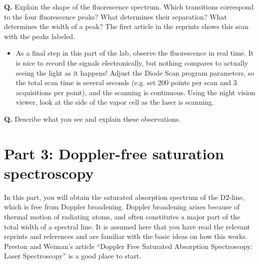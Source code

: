 \documentclass{../lab}
\begin{document}
\textbf{Q.} Explain the shape of the fluorescence spectrum. Which transitions correspond to the four fluorescence peaks? What determines their separation? What determines the width of a peak? The first article in the reprints shows this scan with the peaks labeled.

\begin{itemize}
    \item As a final step in this part of the lab, observe the fluorescence in real time. It is nice to record the signals electronically, but nothing compares to actually seeing the light as it happens! Adjust the Diode Scan program parameters, so the total scan time is several seconds (e.g. set 200 points per scan and 3 acquisitions per point), and the scanning is continuous. Using the night vision viewer, look at the side of the vapor cell as the laser is scanning.

\end{itemize}

\textbf{Q.} Describe what you see and explain these observations.

\section{Part 3: Doppler-free saturation spectroscopy}

In this part, you will obtain the saturated absorption spectrum of the D2-line, which is free from Doppler broadening. Doppler broadening arises because of thermal motion of radiating atoms, and often constitutes a major part of the total width of a spectral line. It is assumed here that you have read the relevant reprints and references and are familiar with the basic ideas on how this works. Preston and Weiman's article ``Doppler Free Saturated Absorption Spectroscopy: Laser Spectroscopy'' is a good place to start.
\end{document}
